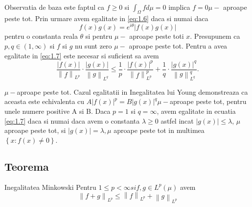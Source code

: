 \documentclass[a4paper,12pt,oneside]{report}
\begin{document}
Observatia de baza este faptul ca  \(f\geq 0\) si \(\int_{\Omega }f d\mu  = 0\) implica \(f = 0 \mu-\) aproape peste tot. 
	Prin urmare avem egalitate in \ref{eq:1.6} daca si numai daca 
\begin{displaymath}
  f\left ( x \right )g\left ( x \right ) = e^{i\theta }\left | f\left ( x \right ) g\left ( x \right )\right |
\end{displaymath}
pentru o constanta reala \(\theta\) si pentru \(\mu-\) aproape peste toti \(x\). 
	Presupunem ca \(p , q \in \left ( 1 , \infty  \right )\) si \(f\) si \(g\) nu sunt zero \(\mu-\) aproape peste tot. Pentru a avea egalitate in \ref{eq:1.7} este necesar si suficient sa avem 
\begin{displaymath}
  \frac{\left | f\left ( x \right ) \right |}{\left \| f \right \|_{L^{p}}} \cdot \frac{\left | g\left ( x \right ) \right |}{\left \| g \right \|_{L^{q}}}\leq \frac{1}{p}\cdot \frac{\left | f\left ( x \right ) \right |^{p}}{\left \| f \right \|^{p}_{L^{p}}} + \frac{1}{q}\cdot \frac{\left | g\left ( x \right ) \right |^{q}}{\left \| g \right \|^{q}_{L^{q}}}. 
\end{displaymath}

\(\mu-\)aproape peste tot. Cazul egalitatii in Inegalitatea lui Young demonstreaza ca aceasta este echivalenta cu \(A\left | f\left ( x \right ) \right |^{p} = B\left | g\left ( x \right ) \right |^{q} \mu-\)aproape peste tot,
pentru unele numere positive A si B. 
	Daca \(p = 1\) si \(q = \infty\), avem egalitate in ecuatia \ref{eq:1.7} daca si numai daca avem o constanta \(\lambda \geq 0\) astfel incat \(\left | g\left ( x \right ) \right |\leq \lambda\),  \(\mu\) aproape peste tot, si \(\left | g\left ( x \right ) \right |= \lambda,  \mu\) aproape peste tot in multimea \(\left \{ x : f\left ( x \right )\neq 0 \right \}\). 

\subsection{Teorema}
Inegalitatea Minkowski
Pentru \(1\leq  p < \infty si f , g \in L^{p}\left ( \mu  \right ) \) avem
\begin{displaymath}
  \left \| f + g  \right \|_{L^{p}}\leq \left \| f \right \|_{L^{p}} + \left \| g \right \|_{L^{p}} \label{eq:1.10} \tag{1.10}
\end{displaymath}
\end{document}
